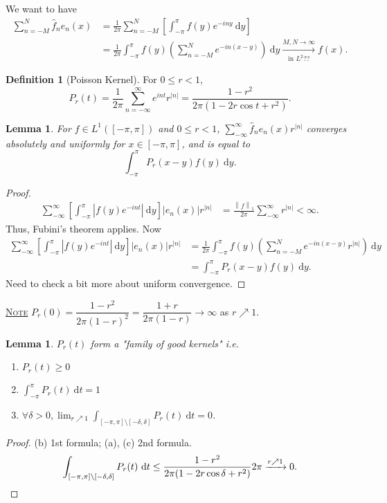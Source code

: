 \documentclass{report}
\newcommand{\df}{\ \mathrm{d}}
\newcommand{\norm}[1]{\left\| #1 \right\|}
\newcommand{\fancyem}[1]{\underline{\textsc{#1}}}
\newtheorem{lemma}[theorem]{Lemma}
\theoremstyle{definition}
\newtheorem{definition}[theorem]{Definition}
\theoremstyle{remark}
\begin{document}
We want to have
\begin{align*}
	\sum_{n = -M}^N \hat{f}_n e_n(x) & = \frac{1}{2\pi}\sum_{n=-M}^N \left[\int_{-\pi}^\pi f(y) e^{-iny} \df y\right] \\
	& = \frac{1}{2\pi}\int_{-\pi}^\pi f(y)\left(\sum_{n=-M}^N e^{-in(x-y)}\right) \df y \xrightarrow[\text{in } L^2 ??]{M, N \to \infty} f(x).
\end{align*}

\begin{definition}
	[Poisson Kernel] For $0 \leq r < 1$, \[P_r(t) = \frac{1}{2\pi}\sum_{n = -\infty}^\infty e^{int}r^{|n|} = \frac{1- r^2}{2\pi(1 - 2r\cos t + r^2)}.\]
\end{definition}
\begin{lemma}\label{le:kerneluni1}
	For $f \in L^1([-\pi, \pi])$ and $0 \leq r < 1$, $\sum_{-\infty}^\infty \hat{f}_n e_n(x)r^{|n|}$ converges absolutely and uniformly for $x \in [-\pi, \pi]$, and is equal to \[
		\int_{-\pi}^\pi P_r(x - y)f(y) \df y.	
	\]
\end{lemma}
\begin{proof}
	\begin{align*}
		\sum_{-\infty}^\infty \left[\int_{-\pi}^\pi \left|f(y)e^{-int}\right| \df y\right]\left|e_n(x)\right|r^{|n|} & = \frac{\norm{f}_1}{2\pi} \sum_{-\infty}^\infty r^{|n|} < \infty.
	\end{align*} Thus, Fubini's theorem applies.
	Now \begin{align*}
		\sum_{-\infty}^\infty \left[\int_{-\pi}^\pi \left|f(y)e^{-int}\right| \df y\right]|e_n(x)|r^{|n|} & = \frac{1}{2\pi} \int_{-\pi}^\pi f(y)\left(\sum_{n=-M}^N e^{-in(x-y)}r^{|n|}\right) \df y \\
		& = \int_{-\pi}^\pi P_r(x - y)f(y) \df y.
	\end{align*}
	Need to check a bit more about uniform convergence.
\end{proof}
\fancyem{Note} $P_r(0) = \dfrac{1-r^2}{2\pi(1 - r)^2} = \dfrac{1 + r}{2\pi(1 - r)} \to \infty$ as $r \nearrow 1$.

\begin{lemma}
	$P_r(t)$ form a "family of good kernels" i.e. \begin{enumerate}
		\item $P_r(t) \geq 0$
		\item $\displaystyle \int_{-\pi}^\pi P_r(t) \df t = 1$
		\item $\displaystyle \forall \delta > 0, \lim_{r \nearrow 1} \int_{[-\pi, \pi] \setminus [-\delta, \delta]} P_r(t) \df t = 0$.
	\end{enumerate}
\end{lemma}
\begin{proof}
	(b) 1st formula; (a), (c) 2nd formula.
	\[
		\int_{[-\pi, \pi] \setminus [-\delta, \delta]} P_r(t) \df t \leq \frac{1 - r^2}{2\pi(1 - 2r\cos\delta + r^2)}2\pi \xrightarrow[]{r \nearrow 1} 0. \qedhere
	\]
\end{proof}
\end{document}
